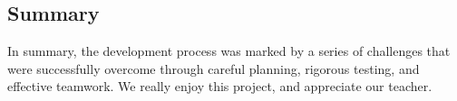 \documentclass[a4paper,12pt]{article}
\begin{document}
\subsection{Summary}

In summary, the development process was marked by a series of challenges that were successfully overcome through careful planning, rigorous testing, and effective teamwork. We really enjoy this project, and appreciate our teacher.

    
    
    

\end{document}
